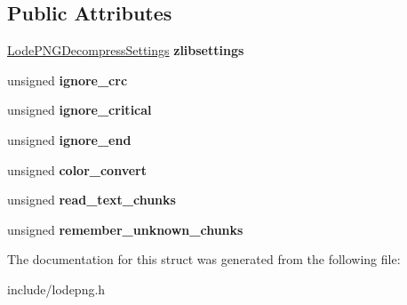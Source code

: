 \subsection*{Public Attributes}
\begin{DoxyCompactItemize}
\item 
\hyperlink{struct_lode_p_n_g_decompress_settings}{Lode\+P\+N\+G\+Decompress\+Settings} {\bfseries zlibsettings}\hypertarget{struct_lode_p_n_g_decoder_settings_a9ae8fef9880bef97a3e932f8ea942ed8}{}\label{struct_lode_p_n_g_decoder_settings_a9ae8fef9880bef97a3e932f8ea942ed8}

\item 
unsigned {\bfseries ignore\+\_\+crc}\hypertarget{struct_lode_p_n_g_decoder_settings_a6390c403d2a5718242337bbbaf15131d}{}\label{struct_lode_p_n_g_decoder_settings_a6390c403d2a5718242337bbbaf15131d}

\item 
unsigned {\bfseries ignore\+\_\+critical}\hypertarget{struct_lode_p_n_g_decoder_settings_a51c3ce791f1b1d325d5e1f7e18caeeea}{}\label{struct_lode_p_n_g_decoder_settings_a51c3ce791f1b1d325d5e1f7e18caeeea}

\item 
unsigned {\bfseries ignore\+\_\+end}\hypertarget{struct_lode_p_n_g_decoder_settings_aa8f3907b3dcaf09892a752806be2fc59}{}\label{struct_lode_p_n_g_decoder_settings_aa8f3907b3dcaf09892a752806be2fc59}

\item 
unsigned {\bfseries color\+\_\+convert}\hypertarget{struct_lode_p_n_g_decoder_settings_af26f2b29cd338ce4476bee9571a0818a}{}\label{struct_lode_p_n_g_decoder_settings_af26f2b29cd338ce4476bee9571a0818a}

\item 
unsigned {\bfseries read\+\_\+text\+\_\+chunks}\hypertarget{struct_lode_p_n_g_decoder_settings_aa1212905c3f73d9fffef2c04a220d951}{}\label{struct_lode_p_n_g_decoder_settings_aa1212905c3f73d9fffef2c04a220d951}

\item 
unsigned {\bfseries remember\+\_\+unknown\+\_\+chunks}\hypertarget{struct_lode_p_n_g_decoder_settings_a8775e4fc539dc457916720f52b442f27}{}\label{struct_lode_p_n_g_decoder_settings_a8775e4fc539dc457916720f52b442f27}

\end{DoxyCompactItemize}


The documentation for this struct was generated from the following file\+:\begin{DoxyCompactItemize}
\item 
include/lodepng.\+h\end{DoxyCompactItemize}
